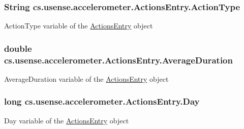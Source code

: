 \subsubsection[{Action\+Type}]{\setlength{\rightskip}{0pt plus 5cm}String cs.\+usense.\+accelerometer.\+Actions\+Entry.\+Action\+Type\hspace{0.3cm}{\ttfamily [private]}}\label{classcs_1_1usense_1_1accelerometer_1_1_actions_entry_a08da28d6c6a891407f52fc81e7eeb0e9}
Action\+Type variable of the \hyperlink{classcs_1_1usense_1_1accelerometer_1_1_actions_entry}{Actions\+Entry} object \hypertarget{classcs_1_1usense_1_1accelerometer_1_1_actions_entry_a2440a558478b3d1e9c83fde2243319cc}{}
\subsubsection[{Average\+Duration}]{\setlength{\rightskip}{0pt plus 5cm}double cs.\+usense.\+accelerometer.\+Actions\+Entry.\+Average\+Duration\hspace{0.3cm}{\ttfamily [private]}}\label{classcs_1_1usense_1_1accelerometer_1_1_actions_entry_a2440a558478b3d1e9c83fde2243319cc}
Average\+Duration variable of the \hyperlink{classcs_1_1usense_1_1accelerometer_1_1_actions_entry}{Actions\+Entry} object \hypertarget{classcs_1_1usense_1_1accelerometer_1_1_actions_entry_af3e47531642c02dc7bf5329cd4181dc1}{}
\subsubsection[{Day}]{\setlength{\rightskip}{0pt plus 5cm}long cs.\+usense.\+accelerometer.\+Actions\+Entry.\+Day\hspace{0.3cm}{\ttfamily [private]}}\label{classcs_1_1usense_1_1accelerometer_1_1_actions_entry_af3e47531642c02dc7bf5329cd4181dc1}
Day variable of the \hyperlink{classcs_1_1usense_1_1accelerometer_1_1_actions_entry}{Actions\+Entry} object \hypertarget{classcs_1_1usense_1_1accelerometer_1_1_actions_entry_aa5c1c9efc45255ade6535b7800084ed9}{}
